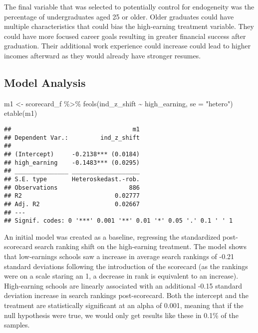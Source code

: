 \documentclass[
]{article}
\newenvironment{Shaded}{\begin{snugshade}}{\end{snugshade}}
\newcommand{\AttributeTok}[1]{\textcolor[rgb]{0.77,0.63,0.00}{#1}}
\newcommand{\FunctionTok}[1]{\textcolor[rgb]{0.00,0.00,0.00}{#1}}
\newcommand{\NormalTok}[1]{#1}
\newcommand{\OtherTok}[1]{\textcolor[rgb]{0.56,0.35,0.01}{#1}}
\newcommand{\SpecialCharTok}[1]{\textcolor[rgb]{0.00,0.00,0.00}{#1}}
\newcommand{\StringTok}[1]{\textcolor[rgb]{0.31,0.60,0.02}{#1}}
\begin{document}
The final variable that was selected to potentially control for
endogeneity was the percentage of undergraduates aged 25 or older. Older
graduates could have multiple characteristics that could bias the
high-earning treatment variable. They could have more focused career
goals resulting in greater financial success after graduation. Their
additional work experience could increase could lead to higher incomes
afterward as they would already have stronger resumes.

\hypertarget{model-analysis}{%
\subsection{Model Analysis}\label{model-analysis}}

\begin{Shaded}
\begin{Highlighting}[]
\NormalTok{m1 }\OtherTok{\textless{}{-}}\NormalTok{ scorecard\_f }\SpecialCharTok{\%\textgreater{}\%} \FunctionTok{feols}\NormalTok{(ind\_z\_shift }\SpecialCharTok{\textasciitilde{}}\NormalTok{ high\_earning, }\AttributeTok{se =} \StringTok{"hetero"}\NormalTok{)}
\FunctionTok{etable}\NormalTok{(m1)}
\end{Highlighting}
\end{Shaded}

\begin{verbatim}
##                                  m1
## Dependent Var.:         ind_z_shift
##                                    
## (Intercept)     -0.2138*** (0.0184)
## high_earning    -0.1483*** (0.0295)
## _______________ ___________________
## S.E. type       Heteroskedast.-rob.
## Observations                    886
## R2                          0.02777
## Adj. R2                     0.02667
## ---
## Signif. codes: 0 '***' 0.001 '**' 0.01 '*' 0.05 '.' 0.1 ' ' 1
\end{verbatim}

An initial model was created as a baseline, regressing the standardized
post-scorecard search ranking shift on the high-earning treatment. The
model shows that low-earnings schools saw a increase in average search
rankings of -0.21 standard deviations following the introduction of the
scorecard (as the rankings were on a scale staring an 1, a decrease in
rank is equivalent to an increase). High-earning schools are linearly
associated with an additional -0.15 standard deviation increase in
search rankings post-scorecard. Both the intercept and the treatment are
statistically significant at an alpha of 0.001, meaning that if the null
hypothesis were true, we would only get results like these in 0.1\% of
the samples.
\end{document}
